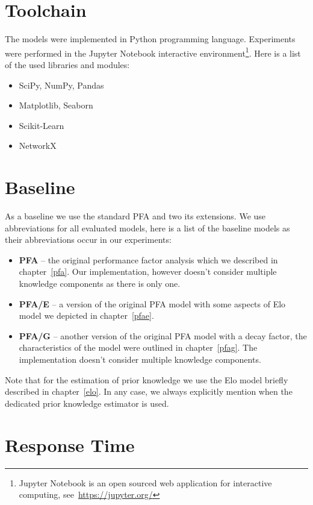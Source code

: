 \section{Toolchain}

The models were implemented in Python programming language. Experiments were performed in the Jupyter Notebook interactive environment\footnote{Jupyter Notebook is an open sourced web application for interactive computing, see~\url{https://jupyter.org/}}. Here is a list of the used libraries and modules:

\begin{itemize}
  \item SciPy, NumPy, Pandas
  \item Matplotlib, Seaborn
  \item Scikit-Learn
  \item NetworkX
\end{itemize}

\section{Baseline}

As a baseline we use the standard PFA and two its extensions. We use abbreviations for all evaluated models, here is a list of the baseline models as their abbreviations occur in our experiments:

\begin{itemize}
  \item \textbf{PFA} -- the original performance factor analysis which we described in chapter~\ref{pfa}. Our implementation, however doesn't consider multiple knowledge components as there is only one.
  \item \textbf{PFA/E} -- a version of the original PFA model with some aspects of Elo model we depicted in chapter~\ref{pfae}.
  \item \textbf{PFA/G} -- another version of the original PFA model with a decay factor, the characteristics of the model were outlined in chapter~\ref{pfag}. The implementation doesn't consider multiple knowledge components.
\end{itemize}

Note that for the estimation of prior knowledge we use the Elo model briefly described in chapter~\ref{elo}. In any case, we always explicitly mention when the dedicated prior knowledge estimator is used.

\section{Response Time}

